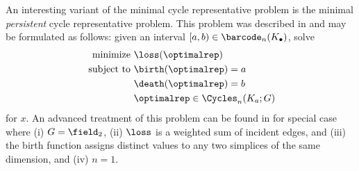 An interesting variant of the minimal cycle representative problem is the minimal \emph{persistent} cycle representative problem.  This problem was described in  \cite{chenquantifying} and may be formulated as follows:  given an interval $[a,b) \in \barcode_n(K_\bullet)$, solve 
\begin{align}
   \begin{split}
    \text{minimize } & \loss(\optimalrep) \\
    \text{ subject to } & \birth(\optimalrep) = a \\
    & \death(\optimalrep) = b \\
    & \optimalrep \in \Cycles_n(K_a; G)
   \end{split}
   \label{eq:minbarcoderep}
\end{align}
for $x$.  An advanced treatment of this problem can be found in \cite{chenquantifying} for special case where (i)  $G = \field_2$, (ii) $\loss$ is a weighted sum of incident edges,  and (iii) the birth function assigns distinct values to any two simplices of the same dimension, and (iv) $n=1$.  






